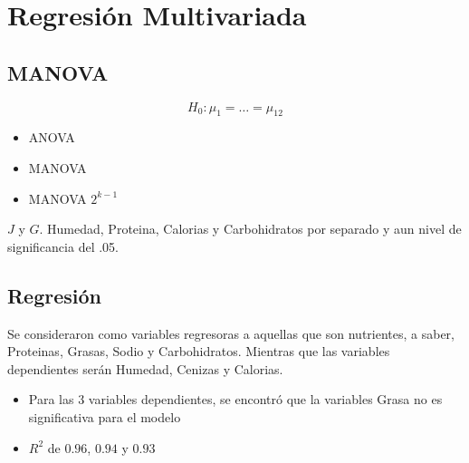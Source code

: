 \documentclass[pdf]{beamer}
\begin{document}
\section{Regresión Multivariada}
\subsection{MANOVA}
\begin{frame}
$$H_0:\mu_1=\hdots=\mu_{12}$$

\end{frame}

\begin{frame}
\begin{itemize}
\item ANOVA
\item MANOVA
\item MANOVA $2^{k-1}$
\end{itemize}
\end{frame}

\begin{frame}
$J$ y $G$.  Humedad, Proteina, Calorias y Carbohidratos por separado y aun nivel de significancia del .05.
\end{frame}

\subsection{Regresión}
\begin{frame}
Se consideraron como variables regresoras a aquellas que son nutrientes, a saber, Proteinas, Grasas, Sodio y Carbohidratos. Mientras que las variables dependientes serán Humedad, Cenizas y Calorias.
\end{frame}

\begin{frame}
\begin{itemize}
\item Para las 3 variables dependientes, se encontró que la variables Grasa no es significativa para el modelo
\item $R^2$ de $0.96$, $0.94$ y $0.93$
\end{itemize}
\end{frame}
\end{document}
